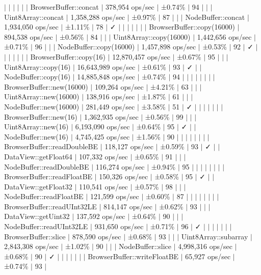$\vert$ $\vert$ $\vert$ $\vert$ $\vert$ $\vert$ Browser\+Buffer\+::concat $\vert$ 378,954 ops/sec $\vert$ ±0.74\% $\vert$ 94 $\vert$ $\vert$ $\vert$ Uint8\+Array\+::concat $\vert$ 1,358,288 ops/sec $\vert$ ±0.97\% $\vert$ 87 $\vert$ $\vert$ $\vert$ Node\+Buffer\+::concat $\vert$ 1,934,050 ops/sec $\vert$ ±1.11\% $\vert$ 78 $\vert$ ✓ $\vert$ $\vert$ $\vert$ $\vert$ $\vert$ $\vert$ $\vert$ Browser\+Buffer\+::copy(16000) $\vert$ 894,538 ops/sec $\vert$ ±0.56\% $\vert$ 84 $\vert$ $\vert$ $\vert$ Uint8\+Array\+::copy(16000) $\vert$ 1,442,656 ops/sec $\vert$ ±0.71\% $\vert$ 96 $\vert$ $\vert$ $\vert$ Node\+Buffer\+::copy(16000) $\vert$ 1,457,898 ops/sec $\vert$ ±0.53\% $\vert$ 92 $\vert$ ✓ $\vert$ $\vert$ $\vert$ $\vert$ $\vert$ $\vert$ $\vert$ Browser\+Buffer\+::copy(16) $\vert$ 12,870,457 ops/sec $\vert$ ±0.67\% $\vert$ 95 $\vert$ $\vert$ $\vert$ Uint8\+Array\+::copy(16) $\vert$ 16,643,989 ops/sec $\vert$ ±0.61\% $\vert$ 93 $\vert$ ✓ $\vert$ $\vert$ Node\+Buffer\+::copy(16) $\vert$ 14,885,848 ops/sec $\vert$ ±0.74\% $\vert$ 94 $\vert$ $\vert$ $\vert$ $\vert$ $\vert$ $\vert$ $\vert$ $\vert$ Browser\+Buffer\+::new(16000) $\vert$ 109,264 ops/sec $\vert$ ±4.21\% $\vert$ 63 $\vert$ $\vert$ $\vert$ Uint8\+Array\+::new(16000) $\vert$ 138,916 ops/sec $\vert$ ±1.87\% $\vert$ 61 $\vert$ $\vert$ $\vert$ Node\+Buffer\+::new(16000) $\vert$ 281,449 ops/sec $\vert$ ±3.58\% $\vert$ 51 $\vert$ ✓ $\vert$ $\vert$ $\vert$ $\vert$ $\vert$ $\vert$ $\vert$ Browser\+Buffer\+::new(16) $\vert$ 1,362,935 ops/sec $\vert$ ±0.56\% $\vert$ 99 $\vert$ $\vert$ $\vert$ Uint8\+Array\+::new(16) $\vert$ 6,193,090 ops/sec $\vert$ ±0.64\% $\vert$ 95 $\vert$ ✓ $\vert$ $\vert$ Node\+Buffer\+::new(16) $\vert$ 4,745,425 ops/sec $\vert$ ±1.56\% $\vert$ 90 $\vert$ $\vert$ $\vert$ $\vert$ $\vert$ $\vert$ $\vert$ $\vert$ Browser\+Buffer\+::read\+Double\+BE $\vert$ 118,127 ops/sec $\vert$ ±0.59\% $\vert$ 93 $\vert$ ✓ $\vert$ $\vert$ Data\+View\+::get\+Float64 $\vert$ 107,332 ops/sec $\vert$ ±0.65\% $\vert$ 91 $\vert$ $\vert$ $\vert$ Node\+Buffer\+::read\+Double\+BE $\vert$ 116,274 ops/sec $\vert$ ±0.94\% $\vert$ 95 $\vert$ $\vert$ $\vert$ $\vert$ $\vert$ $\vert$ $\vert$ $\vert$ Browser\+Buffer\+::read\+Float\+BE $\vert$ 150,326 ops/sec $\vert$ ±0.58\% $\vert$ 95 $\vert$ ✓ $\vert$ $\vert$ Data\+View\+::get\+Float32 $\vert$ 110,541 ops/sec $\vert$ ±0.57\% $\vert$ 98 $\vert$ $\vert$ $\vert$ Node\+Buffer\+::read\+Float\+BE $\vert$ 121,599 ops/sec $\vert$ ±0.60\% $\vert$ 87 $\vert$ $\vert$ $\vert$ $\vert$ $\vert$ $\vert$ $\vert$ $\vert$ Browser\+Buffer\+::read\+U\+Int32\+LE $\vert$ 814,147 ops/sec $\vert$ ±0.62\% $\vert$ 93 $\vert$ $\vert$ $\vert$ Data\+View\+::get\+Uint32 $\vert$ 137,592 ops/sec $\vert$ ±0.64\% $\vert$ 90 $\vert$ $\vert$ $\vert$ Node\+Buffer\+::read\+U\+Int32\+LE $\vert$ 931,650 ops/sec $\vert$ ±0.71\% $\vert$ 96 $\vert$ ✓ $\vert$ $\vert$ $\vert$ $\vert$ $\vert$ $\vert$ $\vert$ Browser\+Buffer\+::slice $\vert$ 878,590 ops/sec $\vert$ ±0.68\% $\vert$ 93 $\vert$ $\vert$ $\vert$ Uint8\+Array\+::subarray $\vert$ 2,843,308 ops/sec $\vert$ ±1.02\% $\vert$ 90 $\vert$ $\vert$ $\vert$ Node\+Buffer\+::slice $\vert$ 4,998,316 ops/sec $\vert$ ±0.68\% $\vert$ 90 $\vert$ ✓ $\vert$ $\vert$ $\vert$ $\vert$ $\vert$ $\vert$ $\vert$ Browser\+Buffer\+::write\+Float\+BE $\vert$ 65,927 ops/sec $\vert$ ±0.74\% $\vert$ 93 $\vert$ 